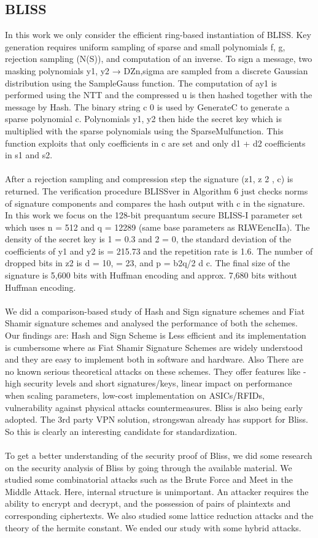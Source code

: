 \documentclass[conference]{IEEEtran}
\begin{document}
\subsection{BLISS}
In this work we only consider the efficient ring-based instantiation of BLISS. Key generation requires uniform sampling of sparse and small polynomials f, g, rejection sampling (N(S)), and computation of an inverse. To sign a message, two masking polynomials y1, y2 → DZn,sigma are sampled from a discrete Gaussian distribution using the SampleGauss function. The computation of ay1 is performed using the NTT and the compressed u is then hashed together with the message by Hash. The binary string c 0 is used by GenerateC to generate a sparse polynomial c. Polynomials y1, y2 then hide the secret key which is multiplied with the sparse polynomials using the SparseMulfunction. This function exploits that only coefficients in c are set and only d1 + d2 coefficients in s1 and s2. \\
\\
After a rejection sampling and compression step the signature (z1, z 2 , c) is returned. The verification procedure BLISSver in Algorithm 6 just checks norms of signature components and compares the hash output with c in the signature. In this work we focus on the 128-bit prequantum secure BLISS-I parameter set which uses n = 512 and q = 12289 (same base parameters as RLWEencIIa). The density of the secret key is 1 = 0.3 and 2 = 0, the standard deviation of the coefficients of y1 and y2 is = 215.73 and the repetition rate is 1.6. The number of dropped bits in z2 is d = 10, = 23, and p = b2q/2 d c. The final size of the signature is 5,600 bits with Huffman encoding and approx. 7,680 bits without Huffman encoding.\\
\\
We did a comparison-based study of Hash and Sign signature schemes and Fiat Shamir signature schemes and analysed the performance of both the schemes. Our findings are:
Hash and Sign Scheme is Less efficient and its implementation is cumbersome where as Fiat Shamir Signature Schemes are widely understood and they are easy to implement both in software and hardware. Also There are no known serious theoretical attacks on these schemes. They offer features like - high security levels and short signatures/keys, linear impact on performance when scaling parameters, low-cost implementation on ASICs/RFIDs, vulnerability against physical attacks countermeasures. 
Bliss is also being early adopted. The 3rd party VPN solution, strongswan already has support for Bliss. So this is clearly an interesting candidate for standardization.\\
\\
To get a better understanding of the security proof of Bliss, we did some research on the security analysis of Bliss by going through the available material. We studied some combinatorial attacks such as the Brute Force and Meet in the Middle Attack. Here, internal structure is unimportant. An attacker requires the ability to encrypt and decrypt, and the possession of pairs of plaintexts and corresponding ciphertexts. We also studied some lattice reduction attacks and the theory of the hermite constant. We ended our study with some hybrid attacks.
\end{document}
